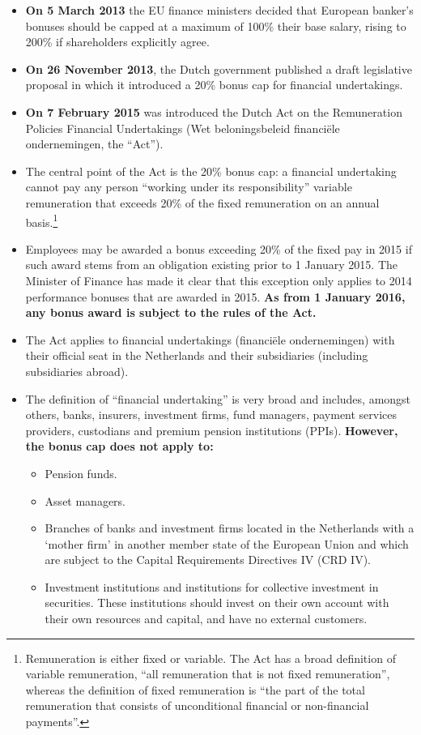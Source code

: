 \documentclass[12pt]{article}
\begin{document}
\begin{itemize}
	\item \textbf{On 5 March 2013} the EU finance ministers decided that European banker's bonuses should be capped at a maximum of 100\% their base salary, rising to 200\% if shareholders explicitly agree. 
	\item \textbf{On 26 November 2013}, the Dutch government published a draft legislative proposal in which it introduced a 20\% bonus
	cap for financial undertakings. 
	\item \textbf{On 7 February 2015} was introduced the Dutch Act on the Remuneration Policies Financial Undertakings (Wet beloningsbeleid financiële ondernemingen, the ``Act'').
	\item The central point of the Act is the 20\% bonus cap: a financial undertaking cannot pay any person ``working under its responsibility'' variable remuneration that exceeds 20\% of the fixed remuneration on an annual
	basis.\footnote{Remuneration is either fixed or variable. The Act has a broad definition of variable remuneration, ``all remuneration that is not fixed remuneration'', whereas the definition of fixed remuneration is ``the part of the total remuneration that consists of unconditional financial or non-financial payments''.}
	\item Employees may be awarded a bonus exceeding 20\% of the fixed pay in 2015 if such award stems from an obligation existing prior to 1 January 2015. The Minister of Finance has made it clear that this exception only applies to 2014 performance bonuses that are awarded in 2015.\textbf{ As from 1 January 2016, any bonus award is subject to the rules of the Act.}
	\item The Act applies to financial undertakings (financiële ondernemingen) with their official seat in the Netherlands and their subsidiaries (including subsidiaries abroad).
	\item The definition of ``financial undertaking'' is very broad and includes, amongst others, banks, insurers, investment firms, fund managers, payment services providers, custodians and premium pension institutions (PPIs). \textbf{However, the bonus cap does not apply to:}
	\begin{itemize}
		\item Pension funds.
		\item Asset managers.
		\item  Branches of banks and investment
		firms located in the Netherlands with a
		‘mother firm’ in another member state
		of the European Union and which are
		subject to the Capital Requirements
		Directives IV (CRD IV).
		\item Investment institutions and institutions
		for collective investment in securities.
		These institutions should invest on their
		own account with their own resources
		and capital, and have no external
		customers.
	\end{itemize}
	
\end{itemize}
\end{document}
